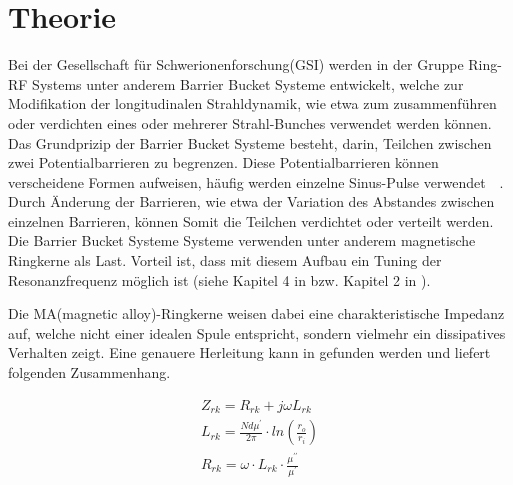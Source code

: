 \section{Theorie}

Bei der Gesellschaft für Schwerionenforschung(GSI) werden in der Gruppe Ring-RF Systems unter anderem  Barrier Bucket Systeme entwickelt, welche zur Modifikation der longitudinalen Strahldynamik, wie etwa zum zusammenf\"uhren oder verdichten eines oder mehrerer Strahl-Bunches verwendet werden k\"onnen. 
Das Grundprizip der Barrier Bucket Systeme besteht, darin, Teilchen zwischen zwei Potentialbarrieren zu begrenzen. Diese Potentialbarrieren k\"onnen verscheidene Formen aufweisen, h\"aufig werden einzelne Sinus-Pulse verwendet~\cite{harzheim2016modeling}~\cite{lee1997particle}. Durch \"Anderung der Barrieren, wie etwa der Variation des Abstandes zwischen einzelnen Barrieren, k\"onnen Somit die Teilchen verdichtet oder verteilt werden.
Die Barrier Bucket Systeme Systeme verwenden unter anderem magnetische Ringkerne als Last. Vorteil ist, dass mit diesem Aufbau ein Tuning der Resonanzfrequenz m\"oglich ist (siehe Kapitel 4 in \cite{Klingbeil2015} bzw. Kapitel 2 in \cite{bast2017ba}).
\par
Die MA(magnetic alloy)-Ringkerne weisen dabei eine charakteristische Impedanz auf, welche nicht einer idealen Spule entspricht, sondern vielmehr ein dissipatives Verhalten zeigt. Eine genauere Herleitung kann in \cite{Klingbeil2015} gefunden werden und liefert folgenden Zusammenhang. 


\begin{align}
Z_{rk} = R_{rk} + j\omega L_{rk}\label{eq_01}\\
L_{rk} = \frac{Nd\mu^\prime}{2\pi}\cdot ln(\frac{r_o}{r_i})\label{eq_02}\\
R_{rk} = \omega\cdot L_{rk}\cdot\frac{\mu^{\prime\prime}}{\mu^{\prime}}\label{eq_03}
\end{align}




